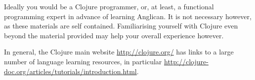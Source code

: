 \documentclass{article}
\begin{document}
Ideally you would be a Clojure programmer, or, at least, a functional 
programming expert in advance of learning Anglican.  It is not necessary however, as these
materials are self contained.  Familiarising yourself
with Clojure even beyond the material provided may help your overall experience however. 

In general, the Clojure main website
\url{http://clojure.org/} has links to a large number of language 
learning resources, in particular \url{http://clojure-doc.org/articles/tutorials/introduction.html}.

  
%
\end{document}
